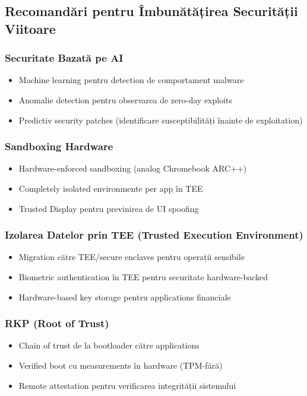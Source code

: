 \documentclass[11pt,a4paper,twocolumn]{article}
\theoremstyle{definition}
\theoremstyle{plain}
\theoremstyle{remark}
\begin{document}
\subsection{Recomandări pentru Îmbunătățirea Securității Viitoare}

\subsubsection{Securitate Bazată pe AI}
\begin{itemize}
    \item Machine learning pentru detection de comportament malware
    \item Anomalie detection pentru observarea de zero-day exploits
    \item Predictiv security patches (identificare susceptibilități înainte de exploitation)
\end{itemize}

\subsubsection{Sandboxing Hardware}
\begin{itemize}
    \item Hardware-enforced sandboxing (analog Chromebook ARC++)
    \item Completely isolated environmente per app în TEE
    \item Trusted Display pentru previnirea de UI spoofing
\end{itemize}

\subsubsection{Izolarea Datelor prin TEE (Trusted Execution Environment)}
\begin{itemize}
    \item Migration către TEE/secure enclaves pentru operații sensibile
    \item Biometric authentication în TEE pentru securitate hardware-backed
    \item Hardware-based key storage pentru applications financiale
\end{itemize}

\subsubsection{RKP (Root of Trust)}
\begin{itemize}
    \item Chain of trust de la bootloader către applications
    \item Verified boot cu measurements în hardware (TPM-fără)
    \item Remote attestation pentru verificarea integrității sistemului
\end{itemize}
\end{document}
